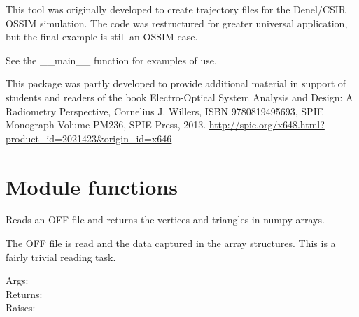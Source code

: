 \documentclass[a4paper,10pt,english]{sphinxmanual}
\begin{document}
This tool was originally developed to create trajectory files for the
Denel/CSIR OSSIM simulation.  The code was restructured for greater
universal application, but the final example is still an OSSIM case.

See the \_\_main\_\_ function for examples of use.

This package was partly developed to provide additional material in support of students 
and readers of the book Electro-Optical System Analysis and Design: A Radiometry 
Perspective,  Cornelius J. Willers, ISBN 9780819495693, SPIE Monograph Volume
PM236, SPIE Press, 2013.  \href{http://spie.org/x648.html?product\_id=2021423\&origin\_id=x646}{http://spie.org/x648.html?product\_id=2021423\&origin\_id=x646}


\section{Module functions}
\label{ryplotspherical:module-functions}

\begin{fulllineitems}
\label{ryplotspherical:pyradi.ryplotspherical.readOffFile}
Reads an OFF file and returns the vertices and triangles in numpy arrays.

The OFF file is read and the data captured in the array structures.
This is a fairly trivial reading task.
\begin{description}
\item[{Args:}] \leavevmode
{}

\item[{Returns:}] \leavevmode
{}

\item[{Raises:}] \leavevmode
{}

\end{description}

\end{fulllineitems}
\end{document}
